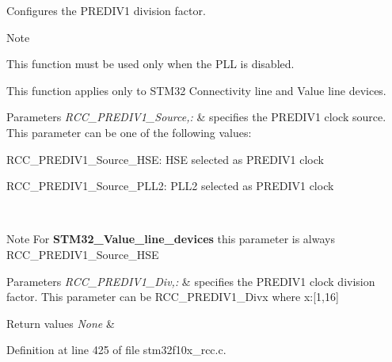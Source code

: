 Configures the P\-R\-E\-D\-I\-V1 division factor. 

\begin{DoxyNote}{Note}

\begin{DoxyItemize}
\item This function must be used only when the P\-L\-L is disabled.
\item This function applies only to S\-T\-M32 Connectivity line and Value line devices. 
\end{DoxyItemize}
\end{DoxyNote}

\begin{DoxyParams}{Parameters}
{\em R\-C\-C\-\_\-\-P\-R\-E\-D\-I\-V1\-\_\-\-Source,\-:} & specifies the P\-R\-E\-D\-I\-V1 clock source. This parameter can be one of the following values\-: \begin{DoxyItemize}
\item R\-C\-C\-\_\-\-P\-R\-E\-D\-I\-V1\-\_\-\-Source\-\_\-\-H\-S\-E\-: H\-S\-E selected as P\-R\-E\-D\-I\-V1 clock \item R\-C\-C\-\_\-\-P\-R\-E\-D\-I\-V1\-\_\-\-Source\-\_\-\-P\-L\-L2\-: P\-L\-L2 selected as P\-R\-E\-D\-I\-V1 clock \end{DoxyItemize}
\\
\hline
\end{DoxyParams}
\begin{DoxyNote}{Note}
For {\bfseries S\-T\-M32\-\_\-\-Value\-\_\-line\-\_\-devices} this parameter is always R\-C\-C\-\_\-\-P\-R\-E\-D\-I\-V1\-\_\-\-Source\-\_\-\-H\-S\-E 
\end{DoxyNote}

\begin{DoxyParams}{Parameters}
{\em R\-C\-C\-\_\-\-P\-R\-E\-D\-I\-V1\-\_\-\-Div,\-:} & specifies the P\-R\-E\-D\-I\-V1 clock division factor. This parameter can be R\-C\-C\-\_\-\-P\-R\-E\-D\-I\-V1\-\_\-\-Divx where x\-:\mbox{[}1,16\mbox{]} \\
\hline
\end{DoxyParams}

\begin{DoxyRetVals}{Return values}
{\em None} & \\
\hline
\end{DoxyRetVals}


Definition at line 425 of file stm32f10x\-\_\-rcc.\-c.

